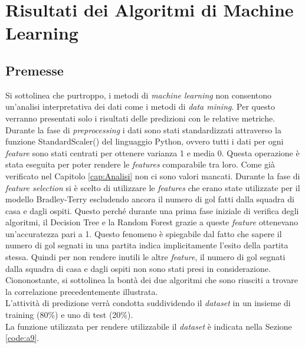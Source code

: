 \chapter{Risultati dei Algoritmi di Machine Learning}
\label{cap:RisML}

\section{Premesse}
Si sottolinea che purtroppo, i metodi di \emph{machine learning} non consentono un'analisi interpretativa dei dati come i metodi di \emph{data mining}. Per questo verranno presentati solo i risultati delle predizioni con le relative metriche.\\
Durante la fase di \emph{preprocessing} i dati sono stati standardizzati attraverso la funzione \textsf{StandardScaler()} del linguaggio Python, ovvero tutti i dati per ogni \emph{feature} sono stati centrati per ottenere varianza 1 e media 0. Questa operazione è stata eseguita per poter rendere le \emph{features} comparabile tra loro. Come già verificato nel Capitolo \ref{cap:Analisi} non ci sono valori mancati. Durante la fase di \emph{feature selection} si è scelto di utilizzare le \emph{features} che erano state utilizzate per il modello Bradley-Terry escludendo ancora il numero di gol fatti dalla squadra di casa e dagli ospiti. Questo perché durante una prima fase iniziale di verifica degli algoritmi, il Decision Tree e la Random Forest grazie a queste \emph{feature} ottenevano un’accuratezza pari a 1. Questo fenomeno è spiegabile dal fatto che sapere il numero di gol segnati in una partita indica implicitamente l'esito della partita stessa. Quindi per non rendere inutili le altre \emph{feature}, il numero di gol segnati dalla squadra di casa e dagli ospiti non sono stati presi in considerazione. Ciononostante, si sottolinea la bontà dei due algoritmi che sono riusciti a trovare la correlazione precedentemente illustrata. \\
L'attività di predizione verrà condotta suddividendo il \emph{dataset} in un insieme di training (80\%) e uno di test (20\%).\\
La funzione utilizzata per rendere utilizzabile il \emph{dataset} è indicata nella Sezione \ref{code:a9}.


